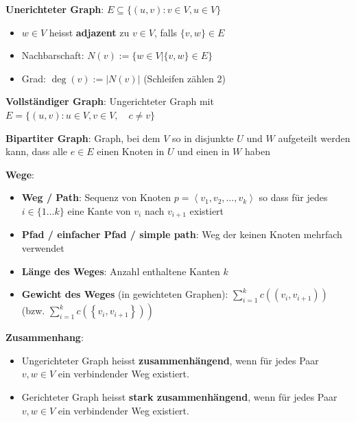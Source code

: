 \begin{sectionbox}
\textbf{Unerichteter Graph}: $E \subseteq \{(u, v): v \in V, u \in V\}$\par
\begin{itemize}
    \item $w \in V$ heisst \textbf{adjazent} zu $v \in V$, falls $\{v, w\} \in E$
    \item Nachbarschaft: $N(v):=\{w \in V |\{v, w\} \in E\}$
    \item Grad: $\operatorname{deg}(v):=|N(v)|$ (Schleifen zählen 2)
\end{itemize}\par\smallskip

\textbf{Vollständiger Graph}: Ungerichteter Graph mit  $E=\{(u, v): u \in V, v \in V, \quad c \neq v\}$\par\smallskip
\textbf{Bipartiter Graph}: Graph, bei dem $V$ so in disjunkte $U$ und $W$ aufgeteilt werden kann, dass alle $e \in E$ einen Knoten in $U$ und einen in $W$ haben\par
\textbf{Wege}:\par
\begin{itemize}
    \item \textbf{Weg / Path}: Sequenz von Knoten $p=\left\langle v_{1}, v_{2}, \ldots, v_{k}\right\rangle$ so dass für jedes $i \in\{1 \ldots k\}$ eine Kante von $v_{i}$ nach $v_{i+1}$ existiert
    \item \textbf{Pfad / einfacher Pfad / simple path}: Weg der keinen Knoten mehrfach verwendet
    \item \textbf{Länge des Weges}: Anzahl enthaltene Kanten $k$
    \item \textbf{Gewicht des Weges} (in gewichteten Graphen): $\sum_{i=1}^{k} c\left(\left(v_{i}, v_{i+1}\right)\right)$ (bzw. $\left.\sum_{i=1}^{k} c\left(\left\{v_{i}, v_{i+1}\right\}\right)\right)$
\end{itemize}\par\smallskip
\textbf{Zusammenhang}:\par
\begin{itemize}
    \item Ungerichteter Graph heisst \textbf{zusammenhängend}, wenn für jedes Paar $v, w \in V$ ein verbindender Weg existiert.
    \item Gerichteter Graph heisst \textbf{stark zusammenhängend}, wenn für jedes Paar $v, w \in V$ ein verbindender Weg existiert.

\end{itemize}
\end{sectionbox}
